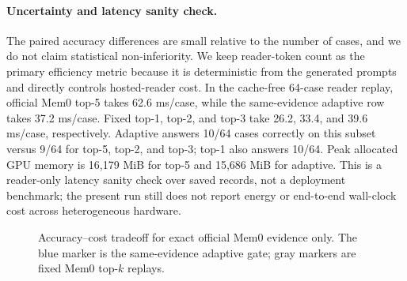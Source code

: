 \documentclass{article}
\begin{document}
\paragraph{Uncertainty and latency sanity check.}
The paired accuracy differences are small relative to the number of cases, and we do not claim statistical non-inferiority. We keep reader-token count as the primary efficiency metric because it is deterministic from the generated prompts and directly controls hosted-reader cost. In the cache-free 64-case reader replay, official Mem0 top-5 takes 62.6 ms/case, while the same-evidence adaptive row takes 37.2 ms/case. Fixed top-1, top-2, and top-3 take 26.2, 33.4, and 39.6 ms/case, respectively. Adaptive answers 10/64 cases correctly on this subset versus 9/64 for top-5, top-2, and top-3; top-1 also answers 10/64. Peak allocated GPU memory is 16{,}179 MiB for top-5 and 15{,}686 MiB for adaptive. This is a reader-only latency sanity check over saved records, not a deployment benchmark; the present run still does not report energy or end-to-end wall-clock cost across heterogeneous hardware.

\begin{figure}[t]
\centering
{}
\caption{Accuracy--cost tradeoff for exact official Mem0 evidence only. The blue marker is the same-evidence adaptive gate; gray markers are fixed Mem0 top-$k$ replays.}
\label{fig:token_reduction}
\end{figure}
\end{document}

